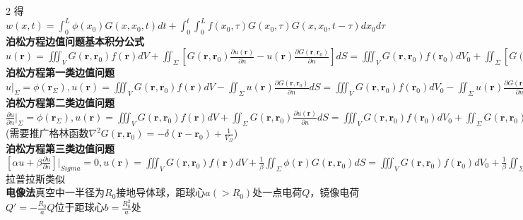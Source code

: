 \documentclass[10pt,a4paper]{article}
\begin{document}
\begin{multicols}{2}
得$w(x,t)=\int_0^L\phi(x_0)G(x,x_0,t)dt+\int_0^t\int_0^Lf(x_0,\tau)G(x_0,\tau)G(x,x_0,t-\tau)dx_0d\tau$\\
\textbf{泊松方程边值问题基本积分公式}$u(\bm{r})=\iiint_VG(\bm{r},\bm{r}_0)f(\bm{r})dV+\iint_{\Sigma}[G(\bm{r},\bm{r}_0)\frac{\partial u(\bm{r})}{\partial n}-u(\bm{r})\frac{\partial G(\bm{r},\bm{r}_0)}{\partial n}]dS=\iiint_VG(\bm{r},\bm{r}_0)f(\bm{r}_0)dV_0+\iint_{\Sigma}[G(\bm{r},\bm{r}_0)\frac{\partial u(\bm{r}_0)}{\partial n_0}-u(\bm{r})\frac{\partial G(\bm{r},\bm{r}_0)}{\partial n_0}]dS_0$\\
\textbf{泊松方程第一类边值问题}$u|_{\Sigma}=\phi(\bm{r}_{\Sigma}),u(\bm{r})=\iiint_VG(\bm{r},\bm{r}_0)f(\bm{r})dV-\iint_{\Sigma}u(\bm{r})\frac{\partial G(\bm{r},\bm{r}_0)}{\partial n}dS=\iiint_VG(\bm{r},\bm{r}_0)f(\bm{r}_0)dV_0-\iint_{\Sigma}u(\bm{r})\frac{\partial G(\bm{r},\bm{r}_0)}{\partial n_0}dS_0$\\
\textbf{泊松方程第二类边值问题}$\frac{\partial u}{\partial n}|_{\Sigma}=\phi(\bm{r}_{\Sigma}),u(\bm{r})=\iiint_VG(\bm{r},\bm{r}_0)f(\bm{r})dV+\iint_{\Sigma}G(\bm{r},\bm{r}_0)\frac{\partial u(\bm{r})}{\partial n}dS=\iiint_VG(\bm{r},\bm{r}_0)f(\bm{r}_0)dV_0+\iint_{\Sigma}G(\bm{r},\bm{r}_0)\frac{\partial u(\bm{r}_0)}{\partial n_0}dS_0$(需要推广格林函数$\nabla^2G(\bm{r},\bm{r}_0)=-\delta(\bm{r}-\bm{r}_0)+\frac{1}{V_{\Omega}}$)\\
\textbf{泊松方程第三类边值问题}$[\alpha u+\beta\frac{\partial u}{\partial n}]|_{Sigma}=0,u(\bm{r})=\iiint_VG(\bm{r},\bm{r}_0)f(\bm{r})dV+\frac{1}{\beta}\iint_{\Sigma}\phi(\bm{r})G(\bm{r},\bm{r}_0)dS=\iiint_VG(\bm{r},\bm{r}_0)f(\bm{r}_0)dV_0+\frac{1}{\beta}\iint_{\Sigma}\phi(\bm{r}_0)G(\bm{r},\bm{r}_0)dS_0$拉普拉斯类似\\
\textbf{电像法}真空中一半径为$R_0$接地导体球，距球心$a(>R_0)$处一点电荷$Q$，镜像电荷$Q'=-\frac{R_0}{a}Q$位于距球心$b=\frac{R_0^2}{a}$处\scriptsize
\end{multicols}
\end{document}
